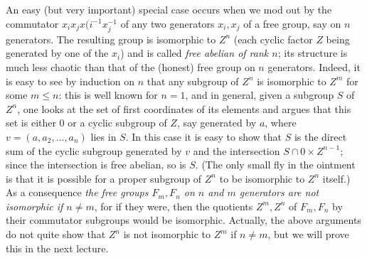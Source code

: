\documentclass[10pt]{article}
\begin{document}
 An easy (but very important) special case occurs when we mod out by the
 commutator $x_i x_j x(i^{-1} x_j^{-1}$ of any two generators $x_i,x_j$
 of a free group, say on $n$ generators. The resulting group is
 isomorphic to $Z^n$ (each cyclic factor $Z$ being generated by one of
 the $x_i$) and is called {\sl free abelian of rank $n$}; its structure
 is much less chaotic than that of the (honest) free group on $n$
 generators. Indeed, it is easy to see by induction on $n$ that any
 subgroup of $Z^n$ is isomorphic to $Z^m$ for some $m\le n$: this is
 well known for $n=1$, and in general, given a subgroup $S$ of $Z^n$,
 one looks at the set of first coordinates of its elements and argues
 that this set is either 0 or a cyclic subgroup of $Z$, say generated by
 $a$, where $v=(a,a_2,\ldots,a_n)$ lies in $S$. In this case it is easy
 to show that $S$ is the direct sum of the cyclic subgroup generated by
 $v$ and the intersection $S\cap 0\times Z^{n-1}$; since the
 intersection is free abelian, so is $S$. (The only small fly in the
 ointment is that it is possible for a proper subgroup of $Z^n$ to be
 isomorphic to $Z^n$ itself.) As a consequence {\sl the free groups
   $F_m,F_n$ on $n$ and $m$ generators are not isomorphic if $n\ne m$},
 for if they were, then the quotients $Z^m,Z^n$ of $F_m,F_n$ by their
 commutator subgroups would be isomorphic. Actually, the above arguments
 do not quite show that $Z^n$ is not isomorphic to $Z^m$ if $n\ne m$,
 but we will prove this in the next lecture.
\end{document}
